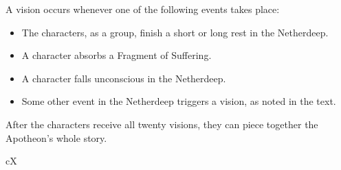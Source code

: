 \documentclass[10pt,a4paper,twoside,bg=print,twocolumn,openany,nodeprecatedcode]{dndbook}
\begin{document}
A vision occurs whenever one of the following events takes place:


\begin{itemize}
\item The characters, as a group, finish a short or long rest in the Netherdeep.
\item A character absorbs a Fragment of Suffering.
\item A character falls unconscious in the Netherdeep.
\item Some other event in the Netherdeep triggers a vision, as noted in the text.
\end{itemize}

After the characters receive all twenty visions, they can piece together the Apotheon's whole story.

\begin{DndTable}[header=Apotheon Lore]{cX}


\end{DndTable}
\end{document}

